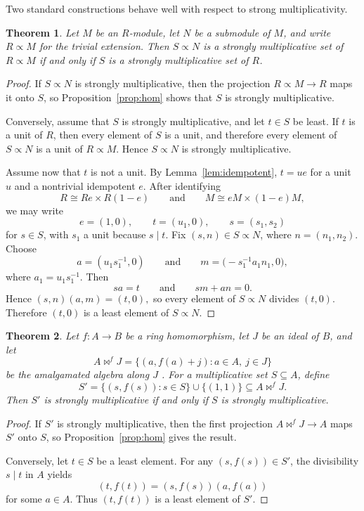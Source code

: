 \documentclass[11pt]{amsart}
\newtheorem{theorem}{Theorem}[section]
\theoremstyle{definition}
\theoremstyle{remark}
\begin{document}
Two standard constructions behave well with respect to strong multiplicativity.

\begin{theorem}\label{thm:trivial}
Let $M$ be an $R$-module, let $N$ be a submodule of $M$, and write $R \propto M$ for the trivial extension.
Then $S \propto N$ is a strongly multiplicative set of $R \propto M$ if and only if $S$ is a strongly multiplicative set of $R$.
\end{theorem}

\begin{proof}
If $S \propto N$ is strongly multiplicative, then the projection $R \propto M \to R$ maps it onto $S$, so Proposition~\ref{prop:hom} shows that $S$ is strongly multiplicative.

Conversely, assume that $S$ is strongly multiplicative, and let $t \in S$ be least.
If $t$ is a unit of $R$, then every element of $S$ is a unit, and therefore every element of $S \propto N$ is a unit of $R \propto M$.
Hence $S \propto N$ is strongly multiplicative.

Assume now that $t$ is not a unit.
By Lemma~\ref{lem:idempotent}, $t=ue$ for a unit $u$ and a nontrivial idempotent $e$.
After identifying
\[
R \cong Re \times R(1-e)
\qquad\text{and}\qquad
M \cong eM \times (1-e)M,
\]
we may write
\[
e=(1,0),\qquad
t=(u_1,0),
\qquad
s=(s_1,s_2)
\]
for $s \in S$, with $s_1$ a unit because $s \mid t$.
Fix $(s,n)\in S \propto N$, where $n=(n_1,n_2)$.
Choose
\[
a=(u_1s_1^{-1},0)
\qquad\text{and}\qquad
m=\bigl(-s_1^{-1}a_1n_1,0\bigr),
\]
where $a_1=u_1s_1^{-1}$.
Then
\[
sa=t
\qquad\text{and}\qquad
sm+an=0.
\]
Hence $(s,n)(a,m)=(t,0),$ so every element of $S \propto N$ divides $(t,0)$.
Therefore $(t,0)$ is a least element of $S \propto N$.
\end{proof}

\begin{theorem}\label{thm:amalgam}
Let $f \colon A \to B$ be a ring homomorphism, let $J$ be an ideal of $B$, and let
\[
A \bowtie^f J=\{(a,f(a)+j): a \in A,\ j \in J\}
\]
be the amalgamated algebra along $J$ \cite{Danna}.
For a multiplicative set $S \subseteq A$, define
\[
S'=\{(s,f(s)) : s \in S\} \cup \{(1,1)\}\subseteq A \bowtie^f J.
\]
Then $S'$ is strongly multiplicative if and only if $S$ is strongly multiplicative.
\end{theorem}

\begin{proof}
If $S'$ is strongly multiplicative, then the first projection $A \bowtie^f J \to A$ maps $S'$ onto $S$, so Proposition~\ref{prop:hom} gives the result.

Conversely, let $t \in S$ be a least element.
For any $(s,f(s)) \in S'$, the divisibility $s \mid t$ in $A$ yields
\[
(t,f(t))=(s,f(s))(a,f(a))
\]
for some $a \in A$.
Thus $(t,f(t))$ is a least element of $S'$.
\end{proof}
\end{document}

